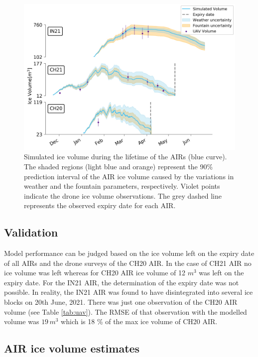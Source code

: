 \documentclass[utf8]{frontiersSCNS}
\begin{document}
\begin{figure}
	\begin{center}
		\includegraphics[width=\linewidth]{Figures/Figure_6.jpg}
	\end{center}
	\caption{Simulated ice volume during the lifetime of the AIRs (blue curve). The shaded regions (light blue and
		orange) represent the 90\% prediction interval of the AIR ice volume caused by the variations in weather and
    the fountain parameters, respectively. Violet points indicate the drone ice volume observations.  The grey
  dashed line represents the observed expiry date for each AIR.  }
	\label{fig:results}
\end{figure}

\subsection{Validation}

Model performance can be judged based on the ice volume left on the expiry date of all AIRs and the drone
surveys of the CH20 AIR. In the case of CH21 AIR no ice volume was left whereas for CH20 AIR ice volume of 12
$m^3$ was left on the expiry date. For the IN21 AIR, the determination of the expiry date was not possible. In
reality, the IN21 AIR was found to have disintegrated into several ice blocks on 20th June, 2021. There was just
one observation of the CH20 AIR volume (see Table \ref{tab:uav}). The RMSE of that observation with the modelled
volume was $19\, m^3$ which is 18 \% of the max ice volume of CH20 AIR.

\subsection{AIR ice volume estimates}
\end{document}
